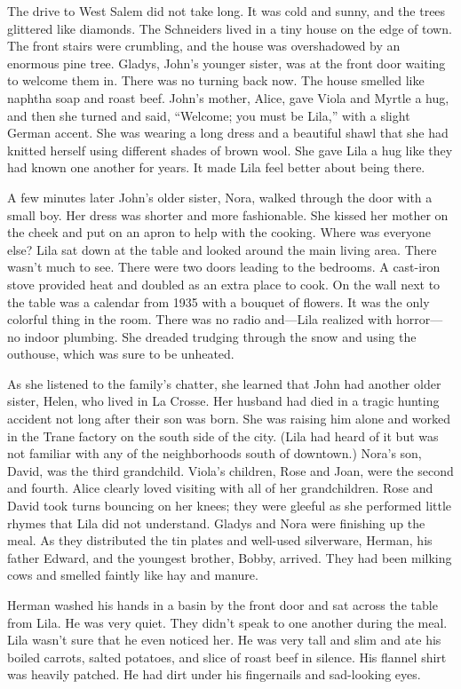\documentclass[
  american,
  letterpaper,
]{book}
\begin{document}
The drive to West Salem did not take long. It was cold and sunny, and
the trees glittered like diamonds. The Schneiders lived in a tiny house
on the edge of town. The front stairs were crumbling, and the house was
overshadowed by an enormous pine tree. Gladys, John's younger sister,
was at the front door waiting to welcome them in. There was no turning
back now. The house smelled like naphtha soap and roast beef. John's
mother, Alice, gave Viola and Myrtle a hug, and then she turned and
said, ``Welcome; you must be Lila,'' with a slight German accent. She
was wearing a long dress and a beautiful shawl that she had knitted
herself using different shades of brown wool. She gave Lila a hug like
they had known one another for years. It made Lila feel better about
being there.

A few minutes later John's older sister, Nora, walked through the door
with a small boy. Her dress was shorter and more fashionable. She kissed
her mother on the cheek and put on an apron to help with the cooking.
Where was everyone else? Lila sat down at the table and looked around
the main living area. There wasn't much to see. There were two doors
leading to the bedrooms. A cast-iron stove provided heat and doubled as
an extra place to cook. On the wall next to the table was a calendar
from 1935 with a bouquet of flowers. It was the only colorful thing in
the room. There was no radio and---Lila realized with horror---no indoor
plumbing. She dreaded trudging through the snow and using the outhouse,
which was sure to be unheated.

As she listened to the family's chatter, she learned that John had
another older sister, Helen, who lived in La Crosse. Her husband had
died in a tragic hunting accident not long after their son was born. She
was raising him alone and worked in the Trane factory on the south side
of the city. (Lila had heard of it but was not familiar with any of the
neighborhoods south of downtown.) Nora's son, David, was the third
grandchild. Viola's children, Rose and Joan, were the second and fourth.
Alice clearly loved visiting with all of her grandchildren. Rose and
David took turns bouncing on her knees; they were gleeful as she
performed little rhymes that Lila did not understand. Gladys and Nora
were finishing up the meal. As they distributed the tin plates and
well-used silverware, Herman, his father Edward, and the youngest
brother, Bobby, arrived. They had been milking cows and smelled faintly
like hay and manure.

Herman washed his hands in a basin by the front door and sat across the
table from Lila. He was very quiet. They didn't speak to one another
during the meal. Lila wasn't sure that he even noticed her. He was very
tall and slim and ate his boiled carrots, salted potatoes, and slice of
roast beef in silence. His flannel shirt was heavily patched. He had
dirt under his fingernails and sad-looking eyes.
\end{document}
